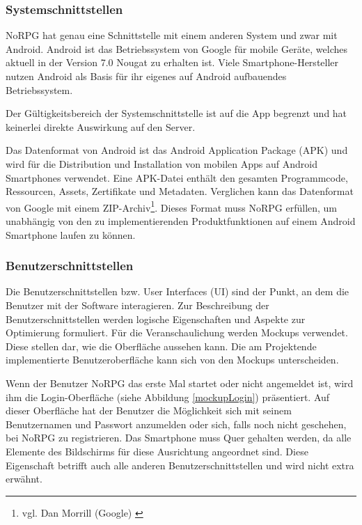 	
		\subsubsection{Systemschnittstellen}
			NoRPG hat genau eine Schnittstelle mit einem anderen System und zwar mit Android. Android ist das Betriebssystem von Google für mobile Geräte, welches aktuell in der Version 7.0 Nougat zu erhalten ist. Viele Smartphone-Hersteller nutzen Android als Basis für ihr eigenes auf Android aufbauendes Betriebssystem. 
			
			Der Gültigkeitsbereich der Systemschnittstelle ist auf die App begrenzt und hat keinerlei direkte Auswirkung auf den Server. 
			
			Das Datenformat von Android ist das Android Application Package (APK) und wird für die Distribution und Installation von mobilen Apps auf Android Smartphones verwendet. Eine APK-Datei enthält den gesamten Programmcode, Ressourcen, Assets, Zertifikate und Metadaten. Verglichen kann das Datenformat von Google mit einem ZIP-Archiv\footnote{vgl. Dan Morrill (Google) \cite{google1}}. Dieses Format muss NoRPG erfüllen, um unabhängig von den zu implementierenden Produktfunktionen auf einem Android Smartphone laufen zu können.
			
		\subsubsection{Benutzerschnittstellen}
			Die Benutzerschnittstellen bzw. User Interfaces (UI) sind der Punkt, an dem die Benutzer mit der Software interagieren. Zur Beschreibung der Benutzerschnittstellen werden logische Eigenschaften und Aspekte zur Optimierung formuliert. Für die Veranschaulichung werden Mockups verwendet. Diese stellen dar, wie die Oberfläche aussehen kann. Die am Projektende implementierte Benutzeroberfläche kann sich von den Mockups unterscheiden.
			
			Wenn der Benutzer NoRPG das erste Mal startet oder nicht angemeldet ist, wird ihm die Login-Oberfläche (siehe Abbildung \ref{mockupLogin}) präsentiert. Auf dieser Oberfläche hat der Benutzer die Möglichkeit sich mit seinem Benutzernamen und Passwort anzumelden oder sich, falls noch nicht geschehen, bei NoRPG zu registrieren. Das Smartphone muss Quer gehalten werden, da alle Elemente des Bildschirms für diese Ausrichtung angeordnet sind. Diese Eigenschaft betrifft auch alle anderen Benutzerschnittstellen und wird nicht extra erwähnt.  
			
